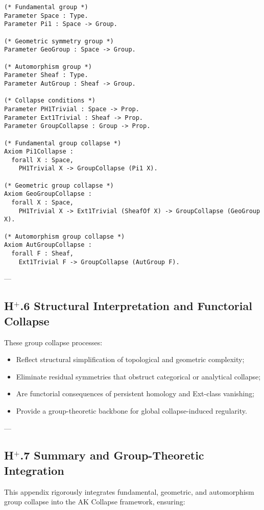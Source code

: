 \documentclass[11pt]{article}
\begin{document}
\begin{lstlisting}[language=Coq]
(* Fundamental group *)
Parameter Space : Type.
Parameter Pi1 : Space -> Group.

(* Geometric symmetry group *)
Parameter GeoGroup : Space -> Group.

(* Automorphism group *)
Parameter Sheaf : Type.
Parameter AutGroup : Sheaf -> Group.

(* Collapse conditions *)
Parameter PH1Trivial : Space -> Prop.
Parameter Ext1Trivial : Sheaf -> Prop.
Parameter GroupCollapse : Group -> Prop.

(* Fundamental group collapse *)
Axiom Pi1Collapse :
  forall X : Space,
    PH1Trivial X -> GroupCollapse (Pi1 X).

(* Geometric group collapse *)
Axiom GeoGroupCollapse :
  forall X : Space,
    PH1Trivial X -> Ext1Trivial (SheafOf X) -> GroupCollapse (GeoGroup X).

(* Automorphism group collapse *)
Axiom AutGroupCollapse :
  forall F : Sheaf,
    Ext1Trivial F -> GroupCollapse (AutGroup F).
\end{lstlisting}

---

\subsection*{H$^{+}$.6 Structural Interpretation and Functorial Collapse}

These group collapse processes:

\begin{itemize}
    \item Reflect structural simplification of topological and geometric complexity;
    \item Eliminate residual symmetries that obstruct categorical or analytical collapse;
    \item Are functorial consequences of persistent homology and Ext-class vanishing;
    \item Provide a group-theoretic backbone for global collapse-induced regularity.
\end{itemize}

---

\subsection*{H$^{+}$.7 Summary and Group-Theoretic Integration}

This appendix rigorously integrates fundamental, geometric, and automorphism group collapse into the AK Collapse framework, ensuring:
\end{document}
